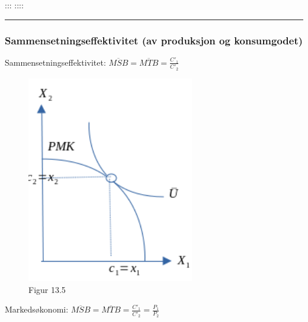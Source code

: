 \documentclass[
  letterpaper,
  DIV=11,
  numbers=noendperiod]{scrartcl}
\begin{document}
::: ::::

\begin{center}\rule{0.5\linewidth}{0.5pt}\end{center}

\subsubsection{Sammensetningseffektivitet (av produksjon og
konsumgodet)}\label{sammensetningseffektivitet-av-produksjon-og-konsumgodet}

Sammensetningseffektivitet:
\(\overline{MSB}=\overline{MTB}=\frac{C'_1}{C'_2}\)

\begin{figure}[H]

{\centering \includegraphics[width=0.65\textwidth,height=\textheight]{drawio/samm_eff.png}

}

\caption{Figur 13.5}

\end{figure}%

Markedsøkonomi:
\(\overline{MSB}=\overline{MTB}=\frac{C'_1}{C'_2}=\frac{P_1}{P_2}\)
\end{document}
